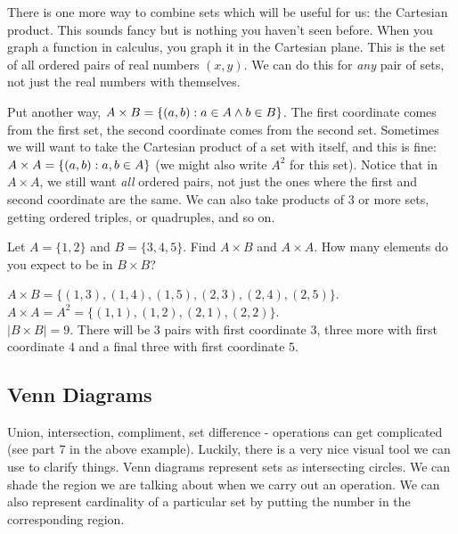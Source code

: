 \documentclass[12pt]{article}
\begin{document}
There is one more way to combine sets which will be useful for us: the Cartesian product.  This sounds fancy but is nothing you haven't seen before.  When you graph a function in calculus, you graph it in the Cartesian plane.  This is the set of all ordered pairs of real numbers $(x,y)$.  We can do this for {\em any} pair of sets, not just the real numbers with themselves.

Put another way, $A \times B = \{(a,b) : a \in A \wedge b \in B\}$.  The first coordinate comes from the first set, the second coordinate comes from the second set.  Sometimes we will want to take the Cartesian product of a set with itself, and this is fine: $A \times A = \{(a,b) : a, b \in A\}$ (we might also write $A^2$ for this set).  Notice that in $A \times A$, we still want {\em all} ordered pairs, not just the ones where the first and second coordinate are the same.  We can also take products of 3 or more sets, getting ordered triples, or quadruples, and so on.

\begin{example}
Let $A = \{1,2\}$ and $B = \{3,4,5\}$.  Find $A \times B$ and $A \times A$.  How many elements do you expect to be in $B \times B$?
\begin{solution}
$A \times B = \{(1,3), (1,4), (1,5), (2,3), (2,4), (2,5)\}$.  \\ $A \times A = A^2 = \{(1,1), (1,2), (2,1), (2,2)\}$. \\
$|B\times B| = 9$.  There will be 3 pairs with first coordinate $3$, three more with first coordinate $4$ and a final three with first coordinate $5$.
\end{solution}
\end{example}
%
%

\subsection{Venn Diagrams}
Union, intersection, compliment, set difference - operations can get complicated (see part 7 in the above example).  Luckily, there is a very nice visual tool we can use to clarify things.  Venn diagrams represent sets as intersecting circles.  We can shade the region we are talking about when we carry out an operation.  We can also represent cardinality of a particular set by putting the number in the corresponding region.\\
\end{document}

